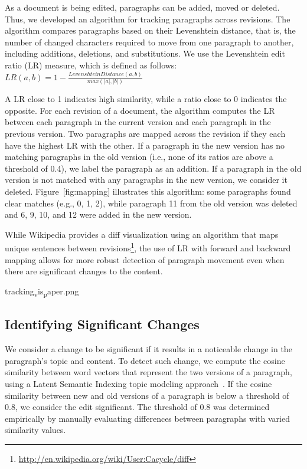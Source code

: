 As a document is being edited, paragraphs can be added, moved or
deleted. Thus, we developed an algorithm for tracking paragraphs across
revisions. The algorithm compares paragraphs based on their Levenshtein
distance, that is, the number of changed characters required to move
from one paragraph to another, including additions, deletions, and
substitutions. We use the Levenshtein edit ratio (LR) measure, which is
defined as follows:
\(LR(a,b) = 1-\frac{Levenshtein Distance(a,b)}{max(|a|,|b|)} \)

A LR close to 1 indicates high similarity, while a ratio close to 0
indicates the opposite. For each revision of a document, the algorithm
computes the LR between each paragraph in the current version and each
paragraph in the previous version. Two paragraphs are mapped across the
revision if they each have the highest LR with the other. If a paragraph
in the new version has no matching paragraphs in the old version (i.e.,
none of its ratios are above a threshold of 0.4), we label the paragraph
as an addition. If a paragraph in the old version is not matched with
any paragraphs in the new version, we consider it deleted.
Figure~{[}fig:mapping{]} illustrates this algorithm: some paragraphs
found clear matches (e.g., 0, 1, 2), while paragraph 11 from the old
version was deleted and 6, 9, 10, and 12 were added in the new version.

While Wikipedia provides a diff visualization using an algorithm that
maps unique sentences between revisions\footnote{\url{http://en.wikipedia.org/wiki/User:Cacycle/diff}},
the use of LR with forward and backward mapping allows for more robust
detection of paragraph movement even when there are significant changes
to the content.

tracking\textsubscript{v}is\textsubscript{p}aper.png

\subsection{Identifying Significant
Changes}\label{identifying-significant-changes}

We consider a change to be significant if it results in a noticeable
change in the paragraph's topic and content. To detect such change, we
compute the cosine similarity between word vectors that represent the
two versions of a paragraph, using a Latent Semantic Indexing topic
modeling approach~\cite{deerwester1990indexing}. If the cosine
similarity between new and old versions of a paragraph is below a
threshold of 0.8, we consider the edit significant. The threshold of 0.8
was determined empirically by manually evaluating differences between
paragraphs with varied similarity values.

